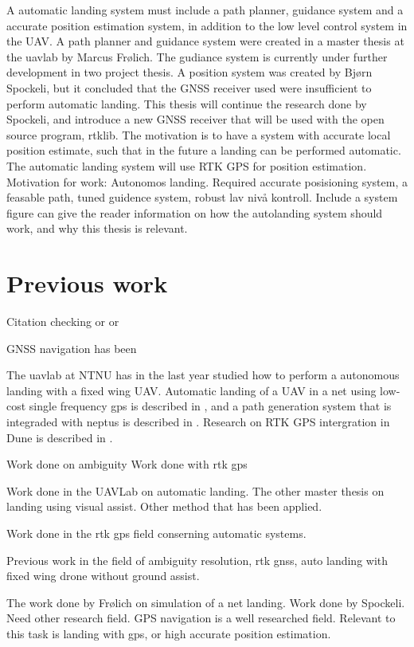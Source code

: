 A automatic landing system must include a path planner, guidance system and a accurate position estimation system, in addition to the low level control system in the UAV. A path planner and guidance system were created in a master thesis at the uavlab by Marcus Frølich. The gudiance system is currently under further development in two project thesis. A position system was created by Bjørn Spockeli, but it concluded that the GNSS receiver used were insufficient to perform automatic landing. This thesis will continue the research done by Spockeli, and introduce a new GNSS receiver that will be used with the open source program, rtklib. The motivation is to have a system with accurate local position estimate, such that in the future a landing can be performed automatic.
The automatic landing system will use RTK GPS for position estimation. 
Motivation for work: Autonomos landing. Required accurate posisioning system, a feasable path, tuned guidence system, robust lav nivå kontroll. Include a system figure can give the reader information on how the autolanding system should work, and why this thesis is relevant.
\section{Previous work}
Citation checking \citep{Spockeli,Froelich} or \cite{Spockeli,Froelich} or \citet{Spockeli,Froelich}

GNSS navigation has been

The uavlab at NTNU has in the last year studied how to perform a autonomous landing with a fixed wing UAV. Automatic landing of a UAV in a net using low-cost single frequency gps is described in \citep{Skulstad&Syversen}, and a path generation system that is integraded with neptus is described in \citep{Froelich}. Research on RTK GPS intergration in Dune is described in \citep{Spockeli}.

Work done on ambiguity
\cite{Ambiguity:Estimation,LAMBDA:METHOD,LAMBDAMETHOD,GeodeticBaselines} 
Work done with rtk gps
\citep{Low-costRTK}  \citep{3D-RTK} 

Work done in the UAVLab on automatic landing. The other master thesis on landing using visual assist. Other method that has been applied. 

Work done in the rtk gps field conserning automatic systems. 

Previous work in the field of ambiguity resolution, rtk gnss, auto landing with fixed wing drone without ground assist.

The work done by Frølich on simulation of a net landing. Work done by Spockeli. Need other research field. GPS navigation is a well researched field. Relevant to this task is landing with gps, or high accurate position estimation. 

